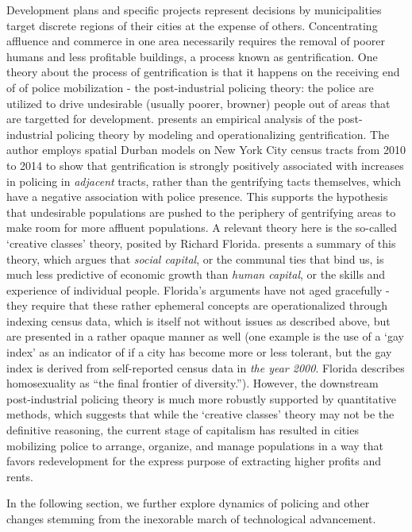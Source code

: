Development plans and specific projects represent decisions by
municipalities target discrete regions of their cities at the expense
of others. Concentrating affluence and commerce in one area
necessarily requires the removal of poorer humans and less profitable
buildings, a process known as gentrification. One theory about the
process of gentrification is that it happens on the receiving end of
of police mobilization - the post-industrial policing theory: the
police are utilized to drive undesirable (usually poorer, browner)
people out of areas that are targetted for
development. \cite{laniyonu2018CoffeeShops} presents an empirical
analysis of the post-industrial policing theory by modeling and
operationalizing gentrification. The author employs spatial Durban
models on New York City census tracts from 2010 to 2014 to show that
gentrification is strongly positively associated with increases in
policing in \emph{adjacent} tracts, rather than the gentrifying tacts
themselves, which have a negative association with police
presence. This supports the hypothesis that undesirable populations are
pushed to the periphery of gentrifying areas to make room for more
affluent populations. A relevant theory here is the so-called
`creative classes' theory, posited by Richard
Florida. \cite{florida2003CitiesCreative} presents a summary of this
theory, which argues that \emph{social capital}, or the communal ties
that bind us, is much less predictive of economic growth
than \emph{human capital}, or the skills and experience of individual
people. Florida's arguments have not aged gracefully - they require
that these rather ephemeral concepts are operationalized through
indexing census data, which is itself not without issues as described above, but are presented
in a rather opaque manner as well (one example is the use of a `gay
index' as an indicator of if a city has become more or less tolerant,
but the gay index is derived from self-reported census data
in \emph{the year 2000}. Florida describes homosexuality as ``the
final frontier of diversity.''). However, the downstream
post-industrial policing theory is much more robustly supported by
quantitative methods, which suggests that while the `creative classes'
theory may not be the definitive reasoning, the current stage of
capitalism has resulted in cities mobilizing police to arrange,
organize, and manage populations in a way that favors redevelopment for
the express purpose of extracting higher profits and rents.

In the following section, we further explore dynamics of policing and
other changes stemming from the inexorable march of technological
advancement.
